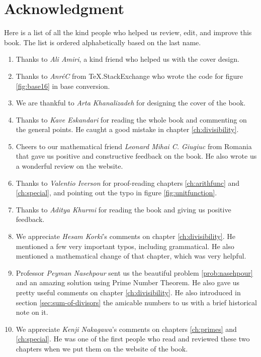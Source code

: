 \documentclass[leqno,12pt]{book}
\begin{document}
\newpage

\section*{Acknowledgment}

Here is a list of all the kind people who helped us review, edit, and improve this book. The list is ordered alphabetically based on the last name.
	\begin{enumerate}
		\item Thanks to \textit{Ali Amiri}, a kind friend who helped us with the cover design.
		\item Thanks to \textit{Anr\'{e}C} from TeX.StackExchange who wrote the code for figure \eqref{fig:base16} in base conversion.
		\item We are thankful to \textit{Arta Khanalizadeh} for designing the cover of the book.
		\item Thanks to \textit{Kave Eskandari} for reading the whole book and commenting on the general points. He caught a good mistake in chapter \ref{ch:divisibility}.
		\item Cheers to our mathematical friend \textit{Leonard Mihai C. Giugiuc} from Romania that gave us positive and constructive feedback on the book. He also wrote us a wonderful review on the website.

		\item Thanks to \textit{Valentio Iverson} for proof-reading chapters \ref{ch:arithfunc} and \ref{ch:special}, and pointing out the typo in figure \eqref{fig:unitfunction}.

		\item Thanks to \textit{Aditya Khurmi} for reading the book and giving us positive feedback.

		\item We appreciate \textit{Hesam Korki}'s comments on chapter \ref{ch:divisibility}. He mentioned a few very important typos, including grammatical. He also mentioned a mathematical change of that chapter, which was very helpful.

		\item Professor \textit{Peyman Nasehpour} sent us the beautiful problem \eqref{prob:nasehpour} and an amazing solution using Prime Number Theorem. He also gave us pretty useful comments on chapter \ref{ch:divisibility}. He also introduced in section \eqref{sec:sum-of-divisors} the amicable numbers to us with a brief historical note on it.

		\item We appreciate \textit{Kenji Nakagawa}'s comments on chapters \ref{ch:primes} and \ref{ch:special}. He was one of the first people who read and reviewed these two chapters when we put them on the website of the book.


\end{enumerate}
\end{document}
